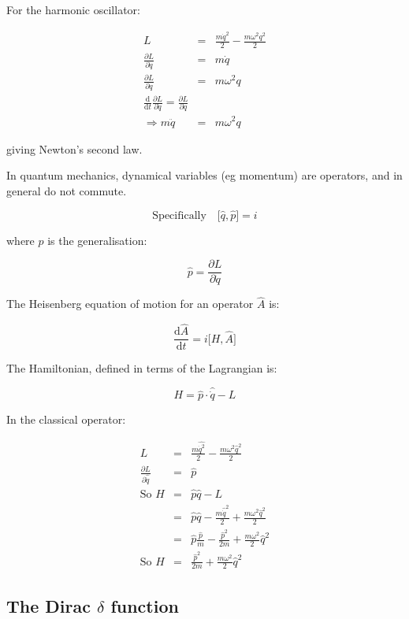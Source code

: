 For the harmonic oscillator:

\begin{eqnarray*}
  L & = & \frac{m\dot{q}^2}{2} - \frac{m\omega^2q^2}{2} \\
  \frac{\partial L}{\partial \dot{q}} & = & m\dot{q} \\
  \frac{\partial L}{\partial q} & = & m\omega^2q \\
  \frac{\mathrm{d}}{\mathrm{d}t}\frac{\partial L}{\partial \dot{q}} = \frac{\partial L}{\partial q} \\
  \Rightarrow m\ddot{q} & = & m\omega^2q
\end{eqnarray*}

giving Newton's second law.

In quantum mechanics, dynamical variables (eg momentum) are operators, and in general do not commute.

\[
  \mathrm{Specifically}\quad \lbrack \hat{q},\hat{p} \rbrack = i
\]

where $\hat{p}$ is the generalisation:

\[
  \hat{p} = \frac{\partial L}{\partial \dot{q}}
\]

The Heisenberg equation of motion for an operator $\hat{A}$ is:

\[
  \frac{\mathrm{d}\hat{A}}{\mathrm{d}t} = i \lbrack H,\hat{A}\rbrack
\]

The Hamiltonian, defined in terms of the Lagrangian is:

\[
  H = \hat{p}\cdot\hat{\dot{q}} - L
\]

In the classical operator:

\begin{eqnarray*}
  L & = & \frac{m\hat{\dot{q}^2}}{2} - \frac{m\omega^2\hat{q}^2}{2} \\
  \frac{\partial L}{\partial \hat{\dot{q}}} & = & \hat{p} \\
  \textrm{So } H & = & \hat{p}\hat{q} - L \\
  & = & \hat{p}\hat{q} - \frac{m\hat{\dot{q}}^2}{2} + \frac{m\omega^2\hat{q}^2}{2} \\
  & = & \hat{p}\frac{\hat{p}}{m} - \frac{\hat{p}^2}{2m} + \frac{m\omega^2}{2}\hat{q}^2 \\
  \textrm{So } H & = & \frac{\hat{p}^2}{2m} + \frac{m\omega^2}{2}\hat{q}^2
\end{eqnarray*}

\subsection{The Dirac \texorpdfstring{$\delta$}{Delta} function}

